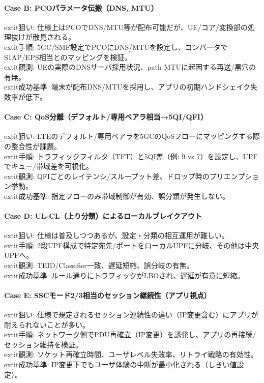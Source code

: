 \paragraph{Case B: PCOパラメータ伝搬（DNS, MTU）}
	extit{狙い}: 仕様上はPCOでDNS/MTU等が配布可能だが、UE/コア/変換部の処理抜けが散見される。\\
	extit{手順}: 5GC/SMF設定でPCOにDNS/MTUを設定し、コンバータでS1AP/EPS相当とのマッピングを検証。\\
	extit{観測}: UEの実際のDNSサーバ採用状況、path MTUに起因する再送/黒穴の有無。\\
	extit{成功基準}: 端末が配布DNS/MTUを採用し、アプリの初期ハンドシェイク失敗率が低下。

\paragraph{Case C: QoS分離（デフォルト/専用ベアラ相当→5QI/QFI）}
	extit{狙い}: LTEのデフォルト/専用ベアラを5GCのQoSフローにマッピングする際の整合性が課題。\\
	extit{手順}: トラフィックフィルタ（TFT）と5QI差（例: 9 vs 7）を設定し、UPFでキュー/帯域差を可視化。\\
	extit{観測}: QFIごとのレイテンシ/スループット差、ドロップ時のプリエンプション挙動。\\
	extit{成功基準}: 指定フローのみ帯域制御が有効、誤分類が発生しない。

\paragraph{Case D: UL-CL（上り分類）によるローカルブレイクアウト}
	extit{狙い}: 仕様は普及しつつあるが、設定・分類の相互運用が難しい。\\
	extit{手順}: 2段UPF構成で特定宛先/ポートをローカルUPFに分岐、その他は中央UPFへ。\\
	extit{観測}: TEID/Classifier一致、遅延短縮、誤分岐の有無。\\
	extit{成功基準}: ルール通りにトラフィックがLBOされ、遅延が有意に短縮。

\paragraph{Case E: SSCモード2/3相当のセッション継続性（アプリ視点）}
	extit{狙い}: 仕様で規定されるセッション連続性の違い（IP変更含む）にアプリが耐えられないことが多い。\\
	extit{手順}: ネットワーク側でPDU再確立（IP変更）を誘発し、アプリの再接続/セッション維持を検証。\\
	extit{観測}: ソケット再確立時間、ユーザレベル失敗率、リトライ戦略の有効性。\\
	extit{成功基準}: IP変更下でもユーザ体験の中断が最小化される（しきい値設定）。

